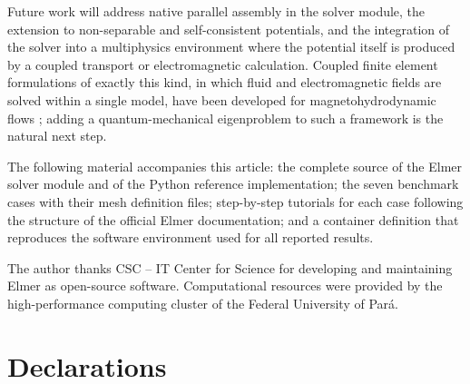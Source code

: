 \documentclass[pdflatex,sn-mathphys-num]{sn-jnl}
\theoremstyle{thmstyleone}%
\theoremstyle{thmstyletwo}%
\theoremstyle{thmstylethree}%
\begin{document}
Future work will address native parallel assembly in the solver module, the
extension to non-separable and self-consistent potentials, and the integration
of the solver into a multiphysics environment where the potential itself is
produced by a coupled transport or electromagnetic calculation. Coupled finite
element formulations of exactly this kind, in which fluid and electromagnetic
fields are solved within a single model, have been developed for
magnetohydrodynamic flows \cite{fonseca2021}; adding a quantum-mechanical
eigenproblem to such a framework is the natural next step.

\backmatter


The following material accompanies this article: the complete source of the
\textsf{Elmer} solver module and of the Python reference implementation; the
seven benchmark cases with their mesh definition files; step-by-step tutorials
for each case following the structure of the official \textsf{Elmer}
documentation; and a container definition that reproduces the software
environment used for all reported results.


The author thanks CSC -- IT Center for Science for developing and maintaining
\textsf{Elmer} as open-source software. Computational resources were provided by
the high-performance computing cluster of the Federal University of Par\'a.

\section*{Declarations}
\end{document}
